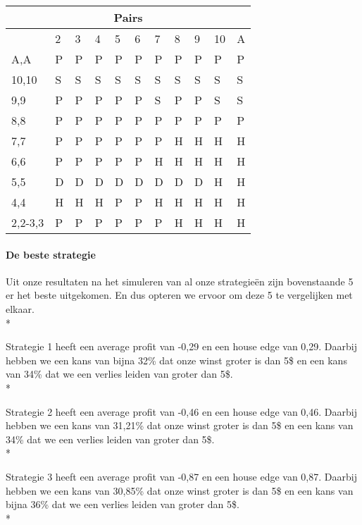 \documentclass[conference]{IEEEtran}
\begin{document}
\begin{table}[ht]
\begin{tabular}{|l|l|l|l|l|l|l|l|l|l|l|}
\multicolumn{11}{|c|}{\textbf{Pairs}}                                 \\ \hline
                             & 2 & 3 & 4 & 5 & 6 & 7 & 8 & 9 & 10 & A \\ \hline
A,A                          & P & P & P & P & P & P & P & P & P & P  \\ \hline
10,10                        & S & S & S & S & S & S & S & S & S & S  \\ \hline
9,9                          & P & P & P & P & P & S & P & P & S & S  \\ \hline
8,8                          & P & P & P & P & P & P & P & P & P & P  \\ \hline
7,7                          & P & P & P & P & P & P & H & H & H & H  \\ \hline
6,6                          & P & P & P & P & P & H & H & H & H & H  \\ \hline
5,5                          & D & D & D & D & D & D & D & D & H & H  \\ \hline
4,4                          & H & H & H & P & P & H & H & H & H & H  \\ \hline
2,2-3,3                      & P & P & P & P & P & P & H & H & H & H  \\ \hline
\end{tabular}
\end{table}

\paragraph{De beste strategie}

Uit onze resultaten na het simuleren van al onze strategie\"en zijn bovenstaande 5 er het beste uitgekomen. En dus opteren we ervoor om deze 5 te vergelijken met elkaar. \\*

Strategie 1 heeft een average profit van -0,29 en een house edge van 0,29. Daarbij hebben we een kans van bijna 32\% dat onze winst groter is dan 5\$ en een kans van 34\% dat we een verlies leiden van groter dan 5\$. \\*

Strategie 2 heeft een average profit van -0,46 en een house edge van 0,46. Daarbij hebben we een kans van 31,21\% dat onze winst groter is dan 5\$ en een kans van 34\% dat we een verlies leiden van groter dan 5\$.\\*

Strategie 3 heeft een average profit van -0,87 en een house edge van 0,87. Daarbij hebben we een kans van 30,85\% dat onze winst groter is dan 5\$ en een kans van bijna 36\% dat we een verlies leiden van groter dan 5\$.\\*
\end{document}

